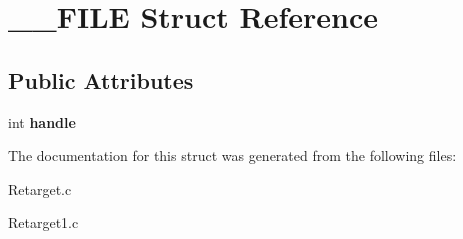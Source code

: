 \hypertarget{struct_____f_i_l_e}{
\section{\_\-\_\-FILE Struct Reference}
\label{struct_____f_i_l_e}
}
\subsection*{Public Attributes}
\begin{DoxyCompactItemize}
\item 
\hypertarget{struct_____f_i_l_e_ac65d6afc3b2c74e74d56195829a1626f}{
int {\bfseries handle}}
\label{struct_____f_i_l_e_ac65d6afc3b2c74e74d56195829a1626f}

\end{DoxyCompactItemize}


The documentation for this struct was generated from the following files:\begin{DoxyCompactItemize}
\item 
Retarget.c\item 
Retarget1.c\end{DoxyCompactItemize}
